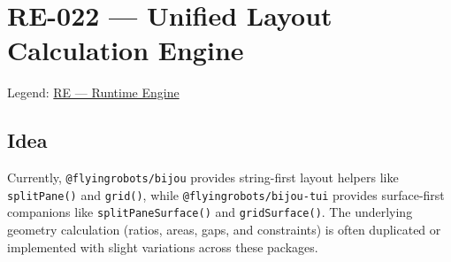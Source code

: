 \chapter{RE-022 --- Unified Layout Calculation Engine}\label{record-376}

\smallskip

Legend: \href{https://github.com/flyingrobots/bijou/blob/cbd70612140e7a450d764b3c7be1c6af878b99bc/docs/method/graveyard/legends/RE-runtime-engine.md}{RE --- Runtime Engine}

\section{Idea}\label{record-376-idea}

Currently, \texttt{@\allowbreak{}f\allowbreak{}l\allowbreak{}y\allowbreak{}i\allowbreak{}n\allowbreak{}g\allowbreak{}r\allowbreak{}o\allowbreak{}b\allowbreak{}o\allowbreak{}t\allowbreak{}s\allowbreak{}/\allowbreak{}b\allowbreak{}i\allowbreak{}j\allowbreak{}o\allowbreak{}u} provides string-first layout helpers like \texttt{s\allowbreak{}p\allowbreak{}l\allowbreak{}i\allowbreak{}t\allowbreak{}P\allowbreak{}a\allowbreak{}n\allowbreak{}e\allowbreak{}(\allowbreak{})} and \texttt{g\allowbreak{}r\allowbreak{}i\allowbreak{}d\allowbreak{}(\allowbreak{})}, while \texttt{@\allowbreak{}f\allowbreak{}l\allowbreak{}y\allowbreak{}i\allowbreak{}n\allowbreak{}g\allowbreak{}r\allowbreak{}o\allowbreak{}b\allowbreak{}o\allowbreak{}t\allowbreak{}s\allowbreak{}/\allowbreak{}b\allowbreak{}i\allowbreak{}j\allowbreak{}o\allowbreak{}u\allowbreak{}-\allowbreak{}t\allowbreak{}u\allowbreak{}i} provides surface-first companions like \texttt{s\allowbreak{}p\allowbreak{}l\allowbreak{}i\allowbreak{}t\allowbreak{}P\allowbreak{}a\allowbreak{}n\allowbreak{}e\allowbreak{}S\allowbreak{}u\allowbreak{}r\allowbreak{}f\allowbreak{}a\allowbreak{}c\allowbreak{}e\allowbreak{}(\allowbreak{})} and \texttt{g\allowbreak{}r\allowbreak{}i\allowbreak{}d\allowbreak{}S\allowbreak{}u\allowbreak{}r\allowbreak{}f\allowbreak{}a\allowbreak{}c\allowbreak{}e\allowbreak{}(\allowbreak{})}. The underlying geometry calculation (ratios, areas, gaps, and constraints) is often duplicated or implemented with slight variations across these packages.

